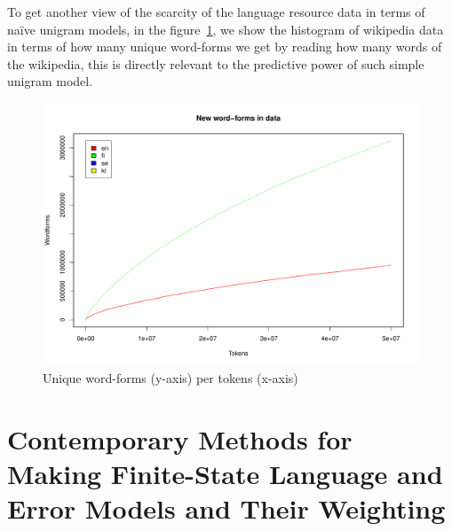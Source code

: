 \documentclass[a4paper,12pt]{article}
\begin{document}
To get another view of the scarcity of the language resource data in terms
of naïve unigram models, in the figure~\ref{fig:forms-vs-tokens}, we show the
histogram of wikipedia data in terms of how many unique word-forms we get by
reading how many words of the wikipedia, this is directly relevant to the
predictive power of such simple unigram model.

\begin{figure}
    \centering
    \includegraphics[width=\textwidth]{graphicx/formspertokens}
    \caption{Unique word-forms (y-axis) per tokens (x-axis)
    \label{fig:forms-vs-tokens}}
\end{figure}

\section{Contemporary Methods for Making Finite-State Language and Error Models
and Their Weighting}
\label{sec:methods}
\end{document}

